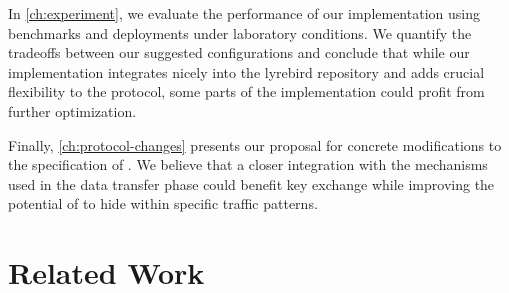 In \cref{ch:experiment}, we evaluate the performance of our implementation using benchmarks and deployments under laboratory conditions. We quantify the tradeoffs between our suggested configurations and conclude that while our implementation integrates nicely into the lyrebird repository and adds crucial flexibility to the protocol, some parts of the implementation could profit from further optimization.

Finally, \cref{ch:protocol-changes} presents our proposal for concrete modifications to the \drivel{} specification of \cite{EPRINT:GRSV25}. We believe that a closer integration with the mechanisms used in the data transfer phase could benefit key exchange while improving the potential of \drivel{} to hide within specific traffic patterns.

\section{Related Work} \label{sec:related-work}

